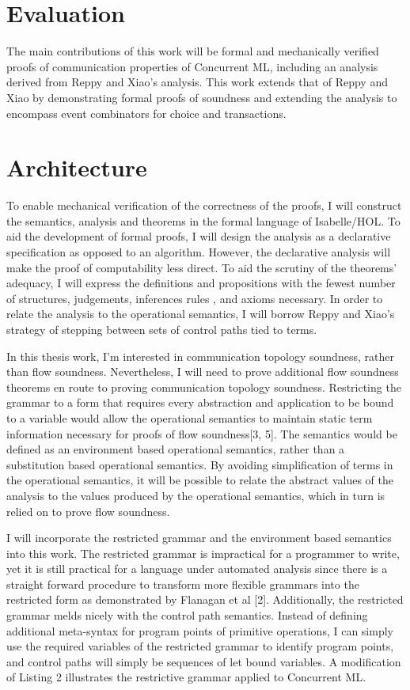 \documentclass{article}
\begin{document}
\section{Evaluation}
The main contributions of this work will be formal and mechanically verified proofs of
communication properties of Concurrent ML, including an analysis derived from Reppy and Xiao's
analysis.  This work extends that of Reppy and Xiao by demonstrating formal proofs of soundness
and extending the analysis to encompass event combinators for choice and transactions.


\section{Architecture}
To enable mechanical verification of the correctness of the proofs, I will construct the
semantics, analysis and theorems in the formal language of Isabelle/HOL.  To aid the
development of formal proofs, I will design the analysis as a declarative specification as
opposed to an algorithm.  However, the declarative analysis will make the proof of
computability less direct.  To aid the scrutiny of the theorems' adequacy, I will express the
definitions and propositions with the fewest number of structures, judgements, inferences rules
, and axioms necessary. In order to relate the analysis to the operational semantics, I will
borrow Reppy and Xiao's strategy of stepping between sets of control paths tied to terms.

In this thesis work, I'm interested in communication topology soundness, rather than flow
soundness.  Nevertheless, I will need to prove additional flow soundness theorems en route to
proving communication topology soundness.  Restricting the grammar to a form that requires
every abstraction and application to be bound to a variable would allow the operational
semantics to maintain static term information necessary for proofs of flow soundness[3, 5].
The semantics would be defined as an environment based operational semantics, rather than a
substitution based operational semantics.  By avoiding simplification of terms in the
operational semantics, it will be possible to relate the abstract values of the analysis to the
values produced by the operational semantics, which in turn is relied on to prove flow
soundness.


I will incorporate the restricted grammar and the environment based semantics into this work.
The restricted grammar is impractical for a programmer to write, yet it is still practical for
a language under automated analysis since there is a straight forward procedure to transform
more flexible grammars into the restricted form as demonstrated by Flanagan et al [2].
Additionally, the restricted grammar melds nicely with the control path semantics.  Instead of
defining additional meta-syntax for program points of primitive operations, I can simply use
the required variables of the restricted grammar to identify program points, and control paths
will simply be sequences of let bound variables. A modification of Listing 2 illustrates the
restrictive grammar applied to Concurrent ML.
\end{document}
